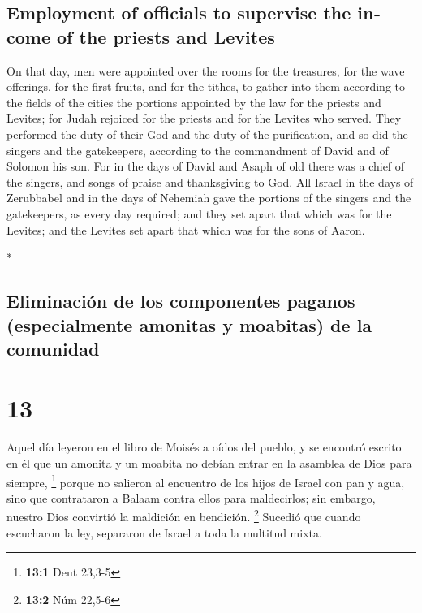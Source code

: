 \begin{paracol}{2}
\begin{otherlanguage}{english}
\hypertarget{employment-of-officials-to-supervise-the-income-of-the-priests-and-levites}{%
\subsection{Employment of officials to supervise the income of the
priests and
Levites}\label{employment-of-officials-to-supervise-the-income-of-the-priests-and-levites}}

 On that day, men were appointed over the rooms for the
treasures, for the wave offerings, for the first fruits, and for the
tithes, to gather into them according to the fields of the cities the
portions appointed by the law for the priests and Levites; for Judah
rejoiced for the priests and for the Levites who served. 
They performed the duty of their God and the duty of the purification,
and so did the singers and the gatekeepers, according to the commandment
of David and of Solomon his son.  For in the days of
David and Asaph of old there was a chief of the singers, and songs of
praise and thanksgiving to God.  All Israel in the days
of Zerubbabel and in the days of Nehemiah gave the portions of the
singers and the gatekeepers, as every day required; and they set apart
that which was for the Levites; and the Levites set apart that which was
for the sons of Aaron.

\end{otherlanguage}

\switchcolumn[0]*

\hypertarget{eliminaciuxf3n-de-los-componentes-paganos-especialmente-amonitas-y-moabitas-de-la-comunidad}{%
\subsection{Eliminación de los componentes paganos (especialmente
amonitas y moabitas) de la
comunidad}\label{eliminaciuxf3n-de-los-componentes-paganos-especialmente-amonitas-y-moabitas-de-la-comunidad}}

\hypertarget{section-24}{%
\section{13}\label{section-24}}

 Aquel día leyeron en el libro de Moisés a oídos del
pueblo, y se encontró escrito en él que un amonita y un moabita no
debían entrar en la asamblea de Dios para siempre, \footnote{\textbf{13:1}
  Deut 23,3-5}  porque no salieron al encuentro de los
hijos de Israel con pan y agua, sino que contrataron a Balaam contra
ellos para maldecirlos; sin embargo, nuestro Dios convirtió la maldición
en bendición. \footnote{\textbf{13:2} Núm 22,5-6}  Sucedió
que cuando escucharon la ley, separaron de Israel a toda la multitud
mixta.


\end{paracol}
